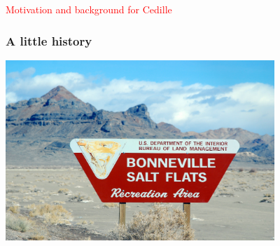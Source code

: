 \documentclass[11pt]{beamer}
\begin{document}

\begin{frame}
\begin{center}
  \Huge
  \qlogo{1.8
    cm}

  \vspace{1cm}

{\Large
  \textcolor{red}{Motivation and background for Cedille}
}
  \end{center}

\end{frame}

\begin{frame}
\frametitle{A little history}

\pause
\begin{center}
\includegraphics[width=4in]{bonnevillesign}
\end{center}

\end{frame}

\setlength{\TPHorizModule}{.1cm}
\setlength{\TPVertModule}{.1cm}

\newcommand{\carbox}[4]{%
\begin{tikzpicture}
    \node at (0,0) {#1};
    \node at (-2.68,-4.2) {\small \emph{#4}};
    \pause
    \node at #2 {#3};

\end{tikzpicture}
}
\end{document}
